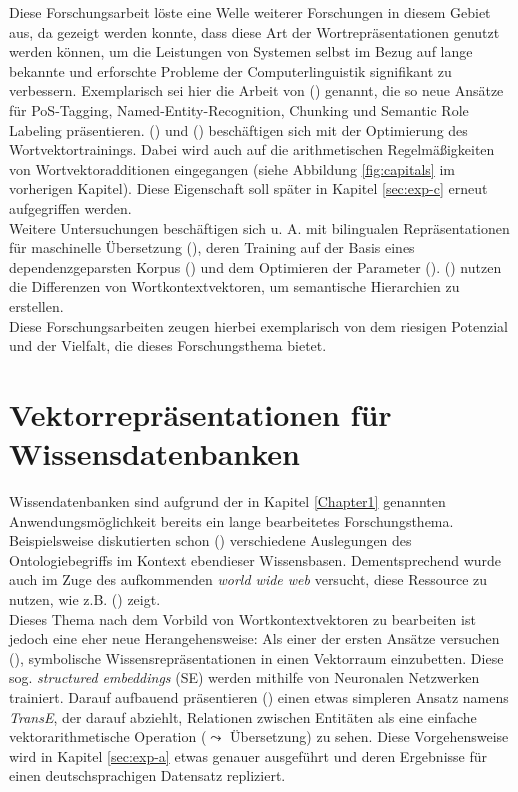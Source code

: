 Diese Forschungsarbeit löste eine Welle weiterer Forschungen in diesem Gebiet aus, da gezeigt werden konnte, dass diese
Art der Wortrepräsentationen genutzt werden können, um die Leistungen von Systemen selbst im Bezug auf lange bekannte und
erforschte Probleme der Computerlinguistik signifikant zu verbessern. Exemplarisch sei hier die Arbeit von
(\cite{collobert2011natural}) genannt, die so neue Ansätze für PoS-Tagging, Named-Entity-Recognition, Chunking und Semantic
Role Labeling präsentieren. (\cite{mikolov2013efficient}) und (\cite{mikolov2013distributed}) beschäftigen sich mit der
Optimierung des Wortvektortrainings. Dabei wird auch auf die arithmetischen Regelmäßigkeiten von Wortvektoradditionen
eingegangen (siehe Abbildung \ref{fig:capitals} im vorherigen Kapitel). Diese Eigenschaft soll später in Kapitel \ref{sec:exp-c} erneut
aufgegriffen werden.\\

Weitere Untersuchungen beschäftigen sich u. A. mit bilingualen Repräsentationen für maschinelle Übersetzung (\cite{zou2013bilingual}),
deren Training auf der Basis eines dependenzgeparsten Korpus (\cite{levy2014dependency}) und dem Optimieren der Parameter
(\cite{levy2015improving}). (\cite{fu2014learning}) nutzen die Differenzen von Wortkontextvektoren, um semantische
Hierarchien zu erstellen.\\
Diese Forschungsarbeiten zeugen hierbei exemplarisch von dem riesigen Potenzial und der Vielfalt, die dieses
Forschungsthema bietet.

\section{Vektorrepräsentationen für Wissensdatenbanken}

Wissendatenbanken sind aufgrund der in Kapitel \ref{Chapter1} genannten Anwendungsmöglichkeit bereits ein lange bearbeitetes
Forschungsthema. Beispielsweise diskutierten schon (\cite{giaretta1995ontologies}) verschiedene Auslegungen des Ontologiebegriffs
im Kontext ebendieser Wissensbasen. Dementsprechend wurde auch im Zuge des aufkommenden \emph{world wide web} versucht, diese
Ressource zu nutzen, wie z.B. (\cite{craven2000learning}) zeigt.\\
Dieses Thema nach dem Vorbild von Wortkontextvektoren zu bearbeiten ist jedoch eine eher neue Herangehensweise: Als
einer der ersten Ansätze versuchen (\cite{bordes2011learning}), symbolische Wissensrepräsentationen in einen Vektorraum
einzubetten. Diese sog. \emph{structured embeddings} (SE) werden mithilfe von Neuronalen Netzwerken trainiert.
Darauf aufbauend präsentieren (\cite{bordes2013translating}) einen etwas simpleren Ansatz namens \emph{TransE}, der darauf abziehlt, Relationen
zwischen Entitäten als eine einfache vektorarithmetische Operation ($\leadsto$ Übersetzung) zu sehen. Diese Vorgehensweise wird in Kapitel \ref{sec:exp-a}
etwas genauer ausgeführt und deren Ergebnisse für einen deutschsprachigen Datensatz repliziert.\\

